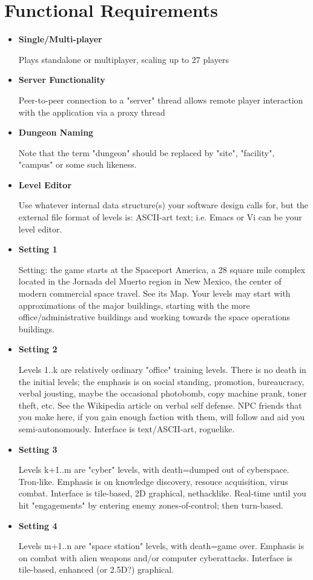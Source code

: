 \documentclass[12pt]{report}
\begin{document}
\section{Functional Requirements}
\begin{itemize}
	\item \textbf{Single/Multi-player}
	
	Plays standalone or multiplayer, scaling up to 27 players
	
	\item \textbf{Server Functionality}
	
	Peer-to-peer connection to a "server" thread allows remote player
	interaction with the application via a proxy thread
	
	\item \textbf{Dungeon Naming}
	
	Note that the term "dungeon" should be replaced by "site", "facility",
	"campus" or some such likeness.
	
	\item \textbf{Level Editor}
	
	Use whatever internal data structure(s) your software design calls
	for, but the external file format of levels is: ASCII-art text; i.e.
	Emacs or Vi can be your level editor.
	
	\item \textbf{Setting 1}
	
	Setting: the game starts at the Spaceport America, a 28 square mile
	complex located in the Jornada del Muerto region in New Mexico, the
	center of modern commercial space travel. See its Map. Your levels may
	start with approximations of the major buildings, starting with the more
	office/administrative buildings and working towards the space operations
	buildings.
	
	\item \textbf{Setting 2}
	
	Levels 1..k are relatively ordinary "office" training levels. There is
	no death in the initial levels; the emphasis is on social standing,
	promotion, bureaucracy, verbal jousting, maybe the occasional photobomb,
	copy machine prank, toner theft, etc. See the Wikipedia article on
	verbal self defense. NPC friends that you make here, if you gain enough
	faction with them, will follow and aid you semi-autonomously. Interface
	is text/ASCII-art, roguelike. 
	
	\item \textbf{Setting 3}
	
	Levels k+1..m are "cyber" levels, with death=dumped out of cyberspace.
	Tron-like. Emphasis is on knowledge discovery, resouce acquisition,
	virus combat. Interface is tile-based, 2D graphical, nethacklike.
	Real-time until you hit "engagements" by entering enemy
	zones-of-control; then turn-based.
	
	\item \textbf{Setting 4}
	
	Levels m+1..n are "space station" levels, with death=game over.
	Emphasis is on combat with alien weapons and/or computer cyberattacks.
	Interface is tile-based, enhanced (or 2.5D?) graphical. 
\end{itemize}
\end{document}
